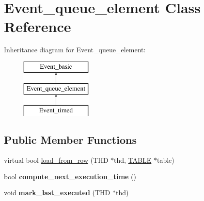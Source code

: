 \hypertarget{classEvent__queue__element}{}\section{Event\+\_\+queue\+\_\+element Class Reference}
\label{classEvent__queue__element}
Inheritance diagram for Event\+\_\+queue\+\_\+element\+:\begin{figure}[H]
\begin{center}
\leavevmode
\includegraphics[height=3.000000cm]{classEvent__queue__element}
\end{center}
\end{figure}
\subsection*{Public Member Functions}
\begin{DoxyCompactItemize}
\item 
virtual bool \mbox{\hyperlink{group__Event__Scheduler_ga2ac60939979bc9d825bbf5d77b3c3025}{load\+\_\+from\+\_\+row}} (T\+HD $\ast$thd, \mbox{\hyperlink{structTABLE}{T\+A\+B\+LE}} $\ast$table)
\item 
bool {\bfseries compute\+\_\+next\+\_\+execution\+\_\+time} ()
\item 
void {\bfseries mark\+\_\+last\+\_\+executed} (T\+HD $\ast$thd)
\end{DoxyCompactItemize}

